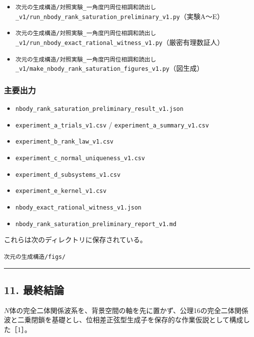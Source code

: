\documentclass[
  a4paper,
]{ltjsarticle}
\providecommand{\tightlist}{%
  \setlength{\itemsep}{0pt}\setlength{\parskip}{0pt}}
\begin{document}
\begin{itemize}
\tightlist
\item
  \texttt{次元の生成構造/対照実験\_一角度円周位相調和読出し\_v1/run\_nbody\_rank\_saturation\_preliminary\_v1.py}（実験A〜E）
\item
  \texttt{次元の生成構造/対照実験\_一角度円周位相調和読出し\_v1/run\_nbody\_exact\_rational\_witness\_v1.py}（厳密有理数証人）
\item
  \texttt{次元の生成構造/対照実験\_一角度円周位相調和読出し\_v1/make\_nbody\_rank\_saturation\_figures\_v1.py}（図生成）
\end{itemize}

\subsubsection{主要出力}\label{ux4e3bux8981ux51faux529b}

\begin{itemize}
\tightlist
\item
  \texttt{nbody\_rank\_saturation\_preliminary\_result\_v1.json}
\item
  \texttt{experiment\_a\_trials\_v1.csv} /
  \texttt{experiment\_a\_summary\_v1.csv}
\item
  \texttt{experiment\_b\_rank\_law\_v1.csv}
\item
  \texttt{experiment\_c\_normal\_uniqueness\_v1.csv}
\item
  \texttt{experiment\_d\_subsystems\_v1.csv}
\item
  \texttt{experiment\_e\_kernel\_v1.csv}
\item
  \texttt{nbody\_exact\_rational\_witness\_v1.json}
\item
  \texttt{nbody\_rank\_saturation\_preliminary\_report\_v1.md}
\end{itemize}

これらは次のディレクトリに保存されている。

\texttt{次元の生成構造/figs/}

\begin{center}\rule{0.5\linewidth}{0.5pt}\end{center}

\subsection{11. 最終結論}\label{ux6700ux7d42ux7d50ux8ad6}

\(N\)体の完全二体関係波系を、背景空間の軸を先に置かず、公理16の完全二体関係波と二乗閉鎖を基礎とし、位相差正弦型生成子を保存的な作業仮説として構成した［1］。
\end{document}
